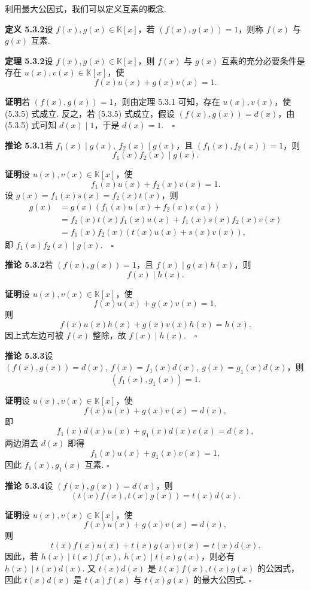 \documentclass[UTF8,12pt,a4paper,fontset=fandol]{ctexart}
\begin{document}
利用最大公因式，我们可以定义互素的概念.

\noindent\textbf{定义 5.3.2}\quad 设 $f(x),g(x)\in\mathbb{K}[x]$，若 $(f(x),g(x))=1$，则称 $f(x)$ 与 $g(x)$ 互素.

\noindent\textbf{定理 5.3.2}\quad 设 $f(x),g(x)\in\mathbb{K}[x]$，则 $f(x)$ 与 $g(x)$ 互素的充分必要条件是存在 $u(x),v(x)\in\mathbb{K}[x]$，使
\begin{equation}
f(x)u(x)+g(x)v(x)=1.
\tag{5.3.5}
\end{equation}

\noindent\textbf{证明}\quad 若 $(f(x),g(x))=1$，则由定理 5.3.1 可知，存在 $u(x),v(x)$，使 (5.3.5) 式成立. 反之，若 (5.3.5) 式成立，假设 $(f(x),g(x))=d(x)$，由 (5.3.5) 式可知 $d(x)\mid 1$，于是 $d(x)=1.\quad \square$

\noindent\textbf{推论 5.3.1}\quad 若 $f_1(x)\mid g(x),\ f_2(x)\mid g(x)$，且 $(f_1(x),f_2(x))=1$，则
\[
f_1(x)f_2(x)\mid g(x).
\]

\noindent\textbf{证明}\quad 设 $u(x),v(x)\in\mathbb{K}[x]$，使
\[
f_1(x)u(x)+f_2(x)v(x)=1.
\]
设 $g(x)=f_1(x)s(x)=f_2(x)t(x)$，则
\[
\begin{aligned}
g(x)&=g(x)(f_1(x)u(x)+f_2(x)v(x))\\
&=f_2(x)t(x)f_1(x)u(x)+f_1(x)s(x)f_2(x)v(x)\\
&=f_1(x)f_2(x)(t(x)u(x)+s(x)v(x)),
\end{aligned}
\]
即 $f_1(x)f_2(x)\mid g(x).\quad \square$

\noindent\textbf{推论 5.3.2}\quad 若 $(f(x),g(x))=1$，且 $f(x)\mid g(x)h(x)$，则
\[
f(x)\mid h(x).
\]

\noindent\textbf{证明}\quad 设 $u(x),v(x)\in\mathbb{K}[x]$，使
\[
f(x)u(x)+g(x)v(x)=1,
\]
则
\[
f(x)u(x)h(x)+g(x)v(x)h(x)=h(x).
\]
因上式左边可被 $f(x)$ 整除，故 $f(x)\mid h(x).\quad \square$

\noindent\textbf{推论 5.3.3}\quad 设 $(f(x),g(x))=d(x),\ f(x)=f_1(x)d(x),\ g(x)=g_1(x)d(x)$，则
\[
(f_1(x),g_1(x))=1.
\]

\noindent\textbf{证明}\quad 设 $u(x),v(x)\in\mathbb{K}[x]$，使
\[
f(x)u(x)+g(x)v(x)=d(x),
\]
即
\[
f_1(x)d(x)u(x)+g_1(x)d(x)v(x)=d(x),
\]
两边消去 $d(x)$ 即得
\[
f_1(x)u(x)+g_1(x)v(x)=1,
\]
因此 $f_1(x),g_1(x)$ 互素. $\square$

\noindent\textbf{推论 5.3.4}\quad 设 $(f(x),g(x))=d(x)$，则
\[
(t(x)f(x),t(x)g(x))=t(x)d(x).
\]

\noindent\textbf{证明}\quad 设 $u(x),v(x)\in\mathbb{K}[x]$，使
\[
f(x)u(x)+g(x)v(x)=d(x),
\]
则
\[
t(x)f(x)u(x)+t(x)g(x)v(x)=t(x)d(x).
\]
因此，若 $h(x)\mid t(x)f(x),\ h(x)\mid t(x)g(x)$，则必有 $h(x)\mid t(x)d(x)$. 又 $t(x)d(x)$ 是 $t(x)f(x),t(x)g(x)$ 的公因式，因此 $t(x)d(x)$ 是 $t(x)f(x)$ 与 $t(x)g(x)$ 的最大公因式. $\square$
\end{document}
